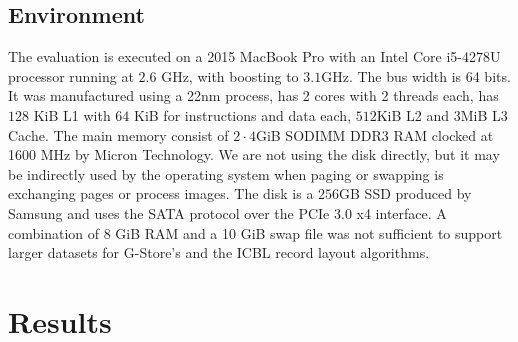     \subsection*{Environment}
        The evaluation is executed on a 2015 MacBook Pro with an Intel Core i5-4278U processor running at $2.6$ GHz, with boosting to $3.1$GHz. The bus width is 64 bits. 
        It was manufactured using a 22nm process, has 2 cores with 2 threads each, has $128$ KiB L1 with $64$ KiB for instructions and data each, $512$KiB L2 and 3MiB L3 Cache.
        The main memory consist of $2 \cdot 4$GiB SODIMM DDR3 RAM clocked at 1600 MHz by Micron Technology.
        We are not using the disk directly, but it may be indirectly used by the operating system when paging or swapping is exchanging pages or process images.
        The disk is a $256$GB SSD produced by Samsung and uses the SATA protocol over the PCIe 3.0 x4 interface. A combination of 8 GiB RAM and a 10 GiB swap file was not sufficient to support larger datasets for G-Store's and the ICBL record layout algorithms.
    
\section{Results}\label{\positionnumber}
